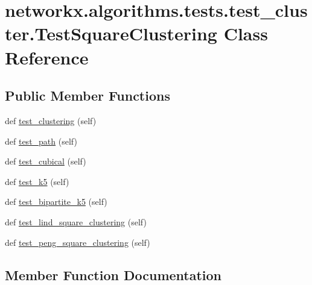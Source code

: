 \hypertarget{classnetworkx_1_1algorithms_1_1tests_1_1test__cluster_1_1TestSquareClustering}{}\section{networkx.\+algorithms.\+tests.\+test\+\_\+cluster.\+Test\+Square\+Clustering Class Reference}
\label{classnetworkx_1_1algorithms_1_1tests_1_1test__cluster_1_1TestSquareClustering}
\subsection*{Public Member Functions}
\begin{DoxyCompactItemize}
\item 
def \hyperlink{classnetworkx_1_1algorithms_1_1tests_1_1test__cluster_1_1TestSquareClustering_a38f487db817dfa6a3777c30ed178dac6}{test\+\_\+clustering} (self)
\item 
def \hyperlink{classnetworkx_1_1algorithms_1_1tests_1_1test__cluster_1_1TestSquareClustering_a73745973afc1dce0c85be4ed86f289ba}{test\+\_\+path} (self)
\item 
def \hyperlink{classnetworkx_1_1algorithms_1_1tests_1_1test__cluster_1_1TestSquareClustering_afe95bc3c73acb33b1f6f1ed929e0a6f0}{test\+\_\+cubical} (self)
\item 
def \hyperlink{classnetworkx_1_1algorithms_1_1tests_1_1test__cluster_1_1TestSquareClustering_a03087972b2686fa26a43f8802a0b5ab9}{test\+\_\+k5} (self)
\item 
def \hyperlink{classnetworkx_1_1algorithms_1_1tests_1_1test__cluster_1_1TestSquareClustering_af13db4c754eeaa85b65845d2e825958b}{test\+\_\+bipartite\+\_\+k5} (self)
\item 
def \hyperlink{classnetworkx_1_1algorithms_1_1tests_1_1test__cluster_1_1TestSquareClustering_a88c095600ef1d3602f5dda928ef92202}{test\+\_\+lind\+\_\+square\+\_\+clustering} (self)
\item 
def \hyperlink{classnetworkx_1_1algorithms_1_1tests_1_1test__cluster_1_1TestSquareClustering_a400d0f1bb469767e7e12451d507f4094}{test\+\_\+peng\+\_\+square\+\_\+clustering} (self)
\end{DoxyCompactItemize}


\subsection{Member Function Documentation}
\mbox{\label{classnetworkx_1_1algorithms_1_1tests_1_1test__cluster_1_1TestSquareClustering_af13db4c754eeaa85b65845d2e825958b}} 
